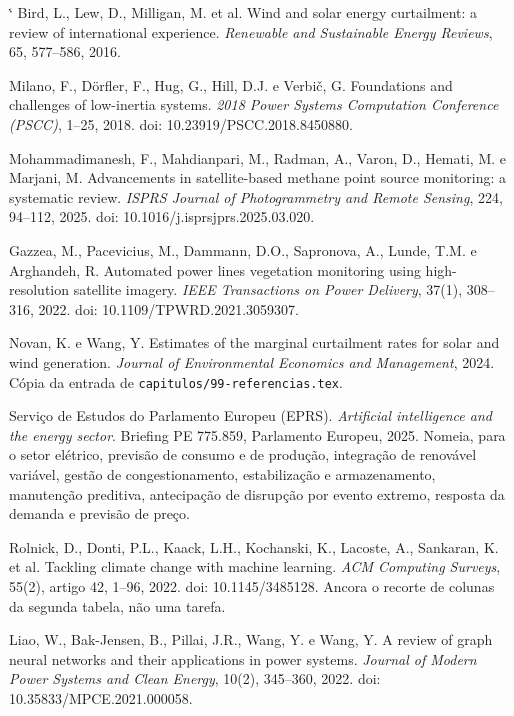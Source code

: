 \documentclass[10pt,a4paper,oneside]{book}
\makeatletter
\renewenvironment{thebibliography}[1]
  {\list{\@biblabel{\@arabic\c@enumiv}}%
     {\settowidth\labelwidth{\@biblabel{#1}}%
      \leftmargin\labelwidth \advance\leftmargin\labelsep
      \usecounter{enumiv}\let\p@enumiv\@empty
      \renewcommand\theenumiv{\@arabic\c@enumiv}}%
   \sloppy\clubpenalty4000 \@clubpenalty\clubpenalty
   \widowpenalty4000 \sfcode`\.\@m}
  {\endlist}
\makeatother
\begin{document}
\begin{landscape}
{\begin{thebibliography}{99}
 Bird, L., Lew, D., Milligan, M. et al. Wind and solar energy
  curtailment: a review of international experience. \emph{Renewable and
  Sustainable Energy Reviews}, 65, 577--586, 2016.

 Milano, F., Dörfler, F., Hug, G., Hill, D.J. e Verbič, G.
  Foundations and challenges of low-inertia systems. \emph{2018 Power Systems
  Computation Conference (PSCC)}, 1--25, 2018.
  doi: 10.23919/PSCC.2018.8450880.

 Mohammadimanesh, F., Mahdianpari, M., Radman, A.,
  Varon, D., Hemati, M. e Marjani, M. Advancements in satellite-based methane
  point source monitoring: a systematic review. \emph{ISPRS Journal of
  Photogrammetry and Remote Sensing}, 224, 94--112, 2025.
  doi: 10.1016/j.isprsjprs.2025.03.020.

 Gazzea, M., Pacevicius, M., Dammann, D.O., Sapronova, A.,
  Lunde, T.M. e Arghandeh, R. Automated power lines vegetation monitoring using
  high-resolution satellite imagery. \emph{IEEE Transactions on Power Delivery},
  37(1), 308--316, 2022. doi: 10.1109/TPWRD.2021.3059307.

 Novan, K. e Wang, Y. Estimates of the marginal curtailment
  rates for solar and wind generation. \emph{Journal of Environmental Economics
  and Management}, 2024. Cópia da entrada de
  \texttt{capitulos/99-referencias.tex}.

 Serviço de Estudos do Parlamento Europeu (EPRS).
  \emph{Artificial intelligence and the energy sector}. Briefing
  PE 775.859, Parlamento Europeu, 2025. Nomeia, para o setor elétrico, previsão
  de consumo e de produção, integração de renovável variável, gestão de
  congestionamento, estabilização e armazenamento, manutenção preditiva,
  antecipação de disrupção por evento extremo, resposta da demanda e previsão de
  preço.

 Rolnick, D., Donti, P.L., Kaack, L.H., Kochanski, K.,
  Lacoste, A., Sankaran, K. et al. Tackling climate change with machine
  learning. \emph{ACM Computing Surveys}, 55(2), artigo 42, 1--96, 2022.
  doi: 10.1145/3485128. Ancora o recorte de colunas da segunda tabela,
  não uma tarefa.

 Liao, W., Bak-Jensen, B., Pillai, J.R., Wang, Y. e Wang, Y.
  A review of graph neural networks and their applications in power systems.
  \emph{Journal of Modern Power Systems and Clean Energy}, 10(2), 345--360,
  2022. doi: 10.35833/MPCE.2021.000058.

\end{thebibliography}
}

\end{landscape}
\end{document}
